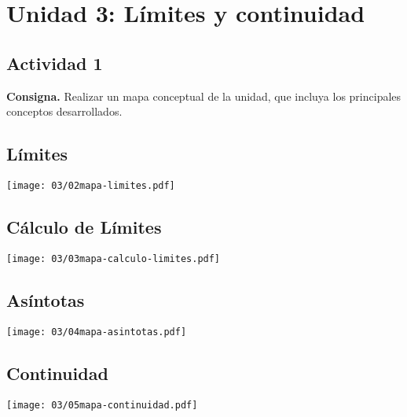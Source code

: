 \section*{Unidad 3: Límites y continuidad}
%

\subsection*{Actividad 1}

\textbf{Consigna.}
Realizar un mapa conceptual de la unidad, que incluya los
principales conceptos desarrollados.

\subsection*{Límites}
\begin{center}
	\texttt{[image: 03/02mapa-limites.pdf]}
\end{center}

\subsection*{Cálculo de Límites}
\begin{center}
	\texttt{[image: 03/03mapa-calculo-limites.pdf]}
\end{center}

\subsection*{Asíntotas}
\begin{center}
	\texttt{[image: 03/04mapa-asintotas.pdf]}
\end{center}

\subsection*{Continuidad}
\begin{center}
	\texttt{[image: 03/05mapa-continuidad.pdf]}
\end{center}
